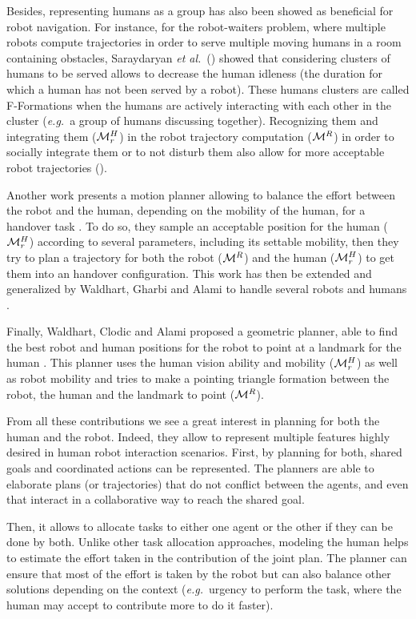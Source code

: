 \documentclass[a4paper,11pt,twoside]{StyleThese}
\begin{document}
Besides, representing humans as a group has also been showed as beneficial for robot navigation. For instance, for the robot-waiters problem, where multiple robots compute trajectories in order to serve multiple moving humans in a room containing obstacles, Saraydaryan \textit{et al.}~(\cite{saraydaryan2015robots}) showed that considering clusters of humans to be served allows to decrease the human idleness (the duration for which a human has not been served by a robot). These humans clusters are called F-Formations when the humans are actively interacting with each other in the cluster (\textit{e.g.}~a group of humans discussing together). Recognizing them and integrating them ($\mathcal{M}^H_r$) in the robot trajectory computation ($\mathcal{M}^R$) in order to socially integrate them or to not disturb them also allow for more acceptable robot trajectories (\cite{althaus2004navigation}).

Another work presents a motion planner allowing to balance the effort between the robot and the human, depending on the mobility of the human, for a handover task \cite{mainprice2012sharing}. To do so, they sample an acceptable position for the human ($\mathcal{M}^H_r$) according to several parameters, including its settable mobility, then they try to plan a trajectory for both the robot ($\mathcal{M}^R$) and the human ($\mathcal{M}^H_r$) to get them into an handover configuration. This work has then be extended and generalized by Waldhart, Gharbi and Alami to handle several robots and humans \cite{waldhart2015planning}.

Finally, Waldhart, Clodic and Alami proposed a geometric planner, able to find the best robot and human positions for the robot to point at a landmark for the human \cite{waldhart_reasoning_shared_2019}. This planner uses the human vision ability and mobility ($\mathcal{M}^H_r$) as well as robot mobility and tries to make a pointing triangle formation between the robot, the human and the landmark to point ($\mathcal{M}^R$).

From all these contributions we see a great interest in planning for both the human and the robot. Indeed, they allow to represent multiple features highly desired in human robot interaction scenarios. First, by planning for both, shared goals and coordinated actions can be represented. The planners are able to elaborate plans (or trajectories) that do not conflict between the agents, and even that interact in a collaborative way to reach the shared goal. 

Then, it allows to allocate tasks to either one agent or the other if they can be done by both. Unlike other task allocation approaches, modeling the human helps to estimate the effort taken in the contribution of the joint plan. The planner can ensure that most of the effort is taken by the robot but can also balance other solutions depending on the context (\textit{e.g.}~urgency to perform the task, where the human may accept to contribute more to do it faster). 
\end{document}
